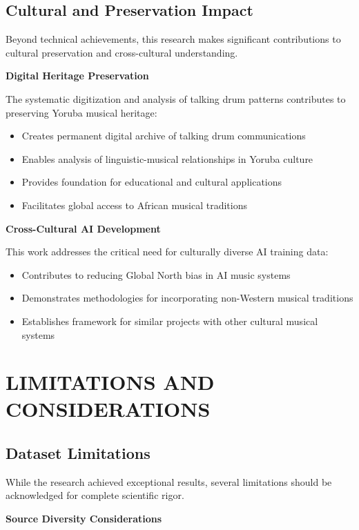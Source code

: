 \documentclass[12pt,a4paper]{article}
\begin{document}
\subsection{Cultural and Preservation Impact}

Beyond technical achievements, this research makes significant contributions to cultural preservation and cross-cultural understanding.

\textbf{Digital Heritage Preservation}

The systematic digitization and analysis of talking drum patterns contributes to preserving Yoruba musical heritage:

\begin{itemize}
\item Creates permanent digital archive of talking drum communications
\item Enables analysis of linguistic-musical relationships in Yoruba culture
\item Provides foundation for educational and cultural applications
\item Facilitates global access to African musical traditions
\end{itemize}

\textbf{Cross-Cultural AI Development}

This work addresses the critical need for culturally diverse AI training data:

\begin{itemize}
\item Contributes to reducing Global North bias in AI music systems
\item Demonstrates methodologies for incorporating non-Western musical traditions
\item Establishes framework for similar projects with other cultural musical systems
\end{itemize}

\section{LIMITATIONS AND CONSIDERATIONS}

\subsection{Dataset Limitations}

While the research achieved exceptional results, several limitations should be acknowledged for complete scientific rigor.

\textbf{Source Diversity Considerations}
\end{document}
